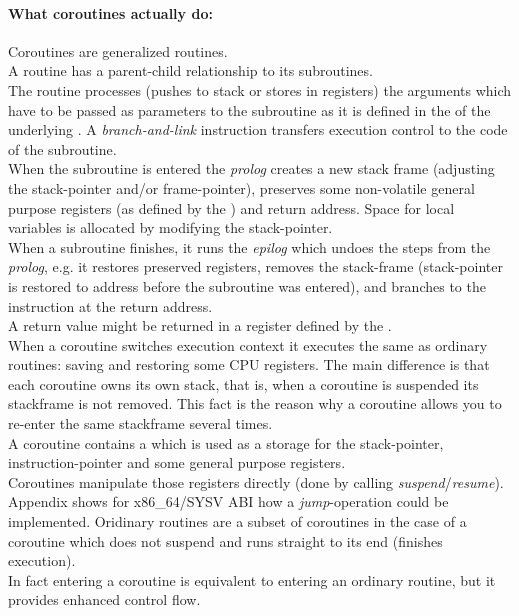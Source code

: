 \paragraph*{What coroutines actually do:}
Coroutines are generalized routines.\\
\newline
A routine has a parent-child relationship to its subroutines.\\
The routine processes (pushes to stack or stores in registers) the arguments which
have to be passed as parameters to the subroutine as it is defined in the \cv
of the underlying \ABI. A \textit{branch-and-link} instruction transfers
execution control to the code of the subroutine.\\
When the subroutine is entered the \textit{prolog} creates a new stack frame
(adjusting the stack-pointer and/or frame-pointer), preserves some
non-volatile general purpose registers (as defined by the \cv) and return
address. Space for local variables is allocated by modifying the
stack-pointer.\\
When a subroutine  finishes, it runs the \textit{epilog} which undoes the steps
from the \textit{prolog}, e.g. it restores preserved registers, removes the
stack-frame (stack-pointer is restored to address before the subroutine was entered),
and branches to the instruction at the return address.\\
A return value might be returned in a register defined by the \cv.\\
\newline
When a coroutine switches execution context it executes the same as
ordinary routines: saving and restoring some CPU registers. The main
difference is that each coroutine owns its own stack, that is, when a coroutine is
suspended its stackframe is not removed. This fact is the reason why a coroutine
allows you to re-enter the same stackframe several times.\\ A coroutine contains a
\cblock which is used as a storage for the stack-pointer, instruction-pointer and
some general purpose registers.\\ Coroutines manipulate those registers directly
(done by calling \textit{suspend}/\textit{resume}).\\
Appendix  shows for x86\_64/SYSV ABI how a
\textit{jump}-operation could be implemented.
\newline
Oridinary routines are a subset of coroutines in the case of a coroutine which
does not suspend and runs straight to its end (finishes execution).\\
\newline
In fact entering a coroutine is equivalent to entering an ordinary routine, but
it provides enhanced control flow.
